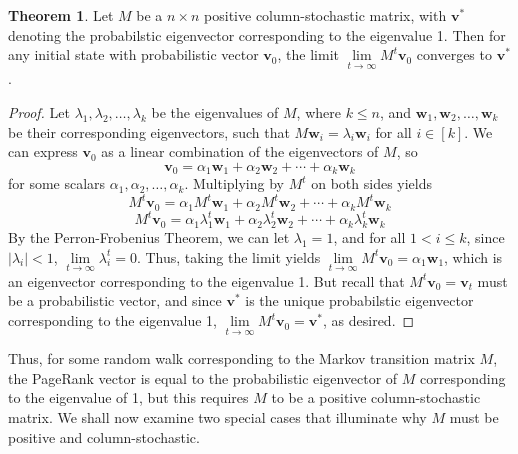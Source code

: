 \documentclass[11pt]{article}
\theoremstyle{definition}
\newtheorem{theorem}{Theorem}
\newcommand{\abs}[1]{\left| #1\right|}
\renewcommand{\vec}[1]{\mathbf{#1}}
\begin{document}

\begin{theorem}
    Let $M$ be a $n\times n$ positive column-stochastic matrix, with $\vec{v}^*$ denoting the probabilstic eigenvector corresponding to the eigenvalue 1.
    Then for any initial state with probabilistic vector $\vec{v}_0$, the limit $\lim\limits_{t\to \infty}{M^t \vec{v}_0}$ converges to $\vec{v}^*$.    
\end{theorem}
\begin{proof}
    Let $\lambda_1, \lambda_2, \ldots, \lambda_k$ be the eigenvalues of $M$, where $k \leq n$, and $\vec{w}_1, \vec{w}_2, \ldots, \vec{w}_k$ be their corresponding eigenvectors, 
    such that $M \vec{w}_i = \lambda_i \vec{w}_i$ for all $i \in [k]$.
    We can express $\vec{v}_0$ as a linear combination of the eigenvectors of $M$, so
    $$\vec{v}_0 = \alpha_1 \vec{w}_1 + \alpha_2 \vec{w}_2 + \cdots + \alpha_k \vec{w}_k$$
    for some scalars $\alpha_1, \alpha_2, \ldots, \alpha_k$. Multiplying by $M^t$ on both sides yields
    $$M^t \vec{v}_0 = \alpha_1 M^t \vec{w}_1 + \alpha_2 M^t \vec{w}_2 + \cdots + \alpha_k M^t \vec{w}_k$$
    $$M^t \vec{v}_0 = \alpha_1 \lambda_1^t \vec{w}_1 + \alpha_2 \lambda_2^t \vec{w}_2 + \cdots + \alpha_k \lambda_k^t \vec{w}_k$$
    By the Perron-Frobenius Theorem, we can let $\lambda_1 = 1$,
    and for all $1 < i \leq k$, since $\abs{\lambda_i} < 1$, $\lim\limits_{t\to \infty}{\lambda_i^t} = 0$.
    Thus, taking the limit yields $\lim\limits_{t\to \infty}{M^t \vec{v}_0} = \alpha_1 \vec{w}_1$, which is an eigenvector corresponding to the eigenvalue 1.
    But recall that $M^t \vec{v}_0 = \vec{v}_t$ must be a probabilistic vector,
    and since $\vec{v}^*$ is the unique probabilstic eigenvector corresponding to the eigenvalue 1, $\lim\limits_{t\to \infty}{M^t \vec{v}_0} = \vec{v}^*$, as desired.
\end{proof}

Thus, for some random walk corresponding to the Markov transition matrix $M$, 
the PageRank vector is equal to the probabilistic eigenvector of $M$ corresponding to the eigenvalue of 1, but this requires $M$ to be a positive column-stochastic matrix.
We shall now examine two special cases that illuminate why $M$ must be positive and column-stochastic.
\end{document}
